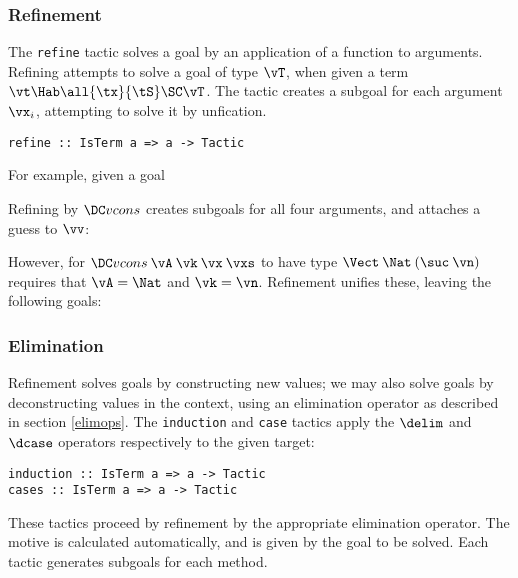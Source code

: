 \subsubsection{Refinement}

The \texttt{refine} tactic solves a goal by an application of a
function to arguments. Refining attempts to solve a goal of type
$\vT$, when given a term $\vt\Hab\all{\tx}{\tS}\SC\vT$. The tactic
creates a subgoal for each argument $\vx_i$, attempting to solve it by
unfication.

\begin{verbatim}
refine :: IsTerm a => a -> Tactic
\end{verbatim}

For example, given a goal
\DM{
\Axiom{
\hole{\vv}{\Vect\:\Nat\:(\suc\:\vn)}}
}

Refining by $\Vcons$ creates subgoals for all four arguments, and
attaches a guess to $\vv$:
\DM{
\Axiom{
\AR{
\hole{\vA}{\Type}\\
\hole{\vk}{\Nat}\\
\hole{\vx}{\vA}\\
\hole{\vxs}{\Vect\:\vA\:\vk}\\
\guess{\vv}{\Vect\:\Nat\:(\suc\:\vn)}{\Vcons\:\vA\:\vk\:\vx\:\vxs}
}
}
}

However, for $\Vcons\:\vA\:\vk\:\vx\:\vxs$ to have type
$\Vect\:\Nat\:(\suc\:\vn)$ requires that $\vA=\Nat$ and $\vk=\vn$.
Refinement unifies these, leaving the
following goals:
\DM{
\Axiom{
\AR{
\hole{\vx}{\Nat}\\
\hole{\vxs}{\Vect\:\Nat\:\vn}\\
\guess{\vv}{\Vect\:\Nat\:(\suc\:\vn)}{\Vcons\:\Nat\:\vn\:\vx\:\vxs}
}
}
}


\subsubsection{Elimination}

Refinement solves goals by constructing new values; we may also solve
goals by deconstructing values in the context, using an elimination
operator as described in section \ref{elimops}. The \texttt{induction}
and \texttt{case} tactics apply the $\delim$ and $\dcase$ operators
respectively to the given target:

\begin{verbatim}
induction :: IsTerm a => a -> Tactic
cases :: IsTerm a => a -> Tactic
\end{verbatim}

These tactics proceed by refinement by the appropriate elimination
operator. The motive is calculated automatically, and is given by the
goal to be solved. Each tactic generates subgoals for each method.

